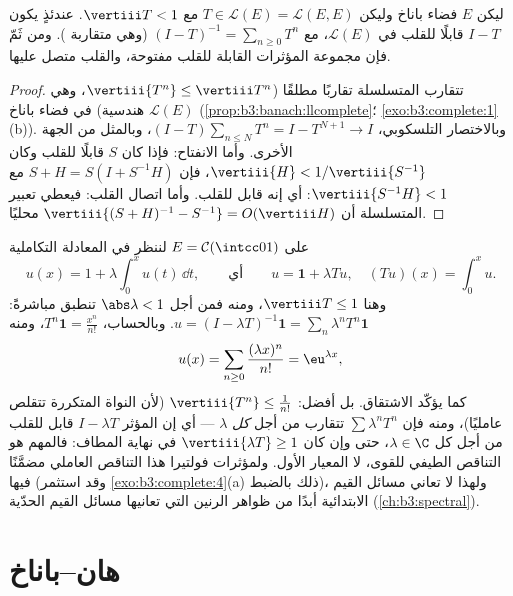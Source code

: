 \begin{proposition}\label{prop:b3:banach:neumann}
ليكن $E$ فضاء باناخ وليكن $T \in \mathcal L(E) = \mathcal L(E,E)$ مع $\vertiii T < 1$. عندئذٍ
يكون $I - T$ قابلًا للقلب في $\mathcal
L(E)$، مع $(I - T)^{-1} = \sum_{n\geq0}T^n$ (وهي متقاربة
). ومن ثَمّ فإن مجموعة المؤثرات القابلة للقلب
مفتوحة، والقلب متصل عليها.
\end{proposition}

\begin{proof}
تتقارب المتسلسلة تقاربًا مطلقًا ($\vertiii{T^n} \leq \vertiii
T^n$، وهي هندسية) في فضاء
باناخ $\mathcal L(E)$ (\cref{prop:b3:banach:llcomplete}؛ \cref{exo:b3:complete:1}(b)). وبالاختصار
التلسكوبي، $(I - T)\sum_{n \leq
N}T^n = I - T^{N+1} \to I$، وبالمثل من الجهة الأخرى. وأما الانفتاح: فإذا
كان $S$ قابلًا للقلب وكان $\vertiii{H} <
1/\vertiii{S^{-1}}$، فإن $S + H = S(I + S^{-1}H)$ مع $\vertiii{S^{-1}H} < 1$: أي إنه
قابل للقلب. وأما اتصال القلب: فيعطي تعبير المتسلسلة أن $\vertiii{(S+H)^{-1} - S^{-1}} =
O(\vertiii H)$
محليًا.
\end{proof}

\begin{example}
\label{ex:b3:banach:volterraexample}
على $E = \mathcal C(\intcc01)$ لننظر في المعادلة التكاملية
\[
u(x) = 1 + \lambda\int_0^xu(t)\,\dd t,
\qquad\text{أي}\qquad u = \mathbf 1 + \lambda Tu,
\quad (Tu)(x) = \int_0^xu .
\]
وهنا $\vertiii T \leq 1$، ومنه فمن أجل $\abs\lambda < 1$ تنطبق  مباشرةً:
$u = (I - \lambda T)^{-1}\mathbf 1 =
\sum_n\lambda^nT^n\mathbf 1$. وبالحساب، $T^n\mathbf 1 =
\frac{x^n}{n!}$، ومنه
\[
u(x) = \sum_{n\geq0}\frac{(\lambda x)^n}{n!} =
\eu^{\lambda x} ,
\]
كما يؤكّد الاشتقاق. بل أفضل: $\vertiii{T^n} \leq
\frac1{n!}$ (لأن النواة المتكررة تتقلص
عامليًا)، ومنه فإن $\sum\lambda^nT^n$ تتقارب من أجل \emph{كل} $\lambda$ ---
أي إن المؤثر $I - \lambda T$ قابل للقلب من أجل كل $\lambda
\in \C$، حتى
وإن كان $\vertiii{\lambda T} \geq 1$ في نهاية المطاف: فالمهم هو التناقص الطيفي للقوى،
لا المعيار الأول. ولمؤثرات فولتيرا هذا التناقص العاملي مضمَّنًا
فيها (وقد استثمر \cref{exo:b3:complete:4}(a) ذلك بالضبط)، ولهذا لا تعاني
مسائل القيم الابتدائية أبدًا من ظواهر الرنين التي تعانيها مسائل
القيم الحدّية (\cref{ch:b3:spectral}).
\end{example}

\section{هان--باناخ}

